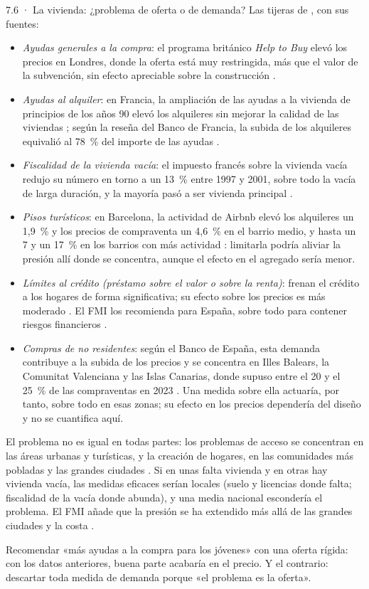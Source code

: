 \begin{complemento}{7.6 · La vivienda: ¿problema de oferta o de demanda? Las tijeras de }
, con sus fuentes:
\begin{itemize}
\item \emph{Ayudas generales a la compra}: el programa británico \emph{Help to Buy} elevó los precios en Londres, donde la oferta está muy restringida, más que el valor de la subvención, sin efecto apreciable sobre la construcción \parencite{Carozzi2024HelpToBuy}.
\item \emph{Ayudas al alquiler}: en Francia, la ampliación de las ayudas a la vivienda de principios de los años 90 elevó los alquileres sin mejorar la calidad de las viviendas \parencite{Fack2006Ayudas}; según la reseña del Banco de Francia, la subida de los alquileres equivalió al 78~\% del importe de las ayudas \parencite{BdF2023AyudasVivienda}.
\item \emph{Fiscalidad de la vivienda vacía}: el impuesto francés sobre la vivienda vacía redujo su número en torno a un 13~\% entre 1997 y 2001, sobre todo la vacía de larga duración, y la mayoría pasó a ser vivienda principal \parencite{Segu2020Vacantes}.
\item \emph{Pisos turísticos}: en Barcelona, la actividad de Airbnb elevó los alquileres un 1,9~\% y los precios de compraventa un 4,6~\% en el barrio medio, y hasta un 7 y un 17~\% en los barrios con más actividad \parencite{GarciaLopez2020Airbnb}: limitarla podría aliviar la presión allí donde se concentra, aunque el efecto en el agregado sería menor.
\item \emph{Límites al crédito (préstamo sobre el valor o sobre la renta)}: frenan el crédito a los hogares de forma significativa; su efecto sobre los precios es más moderado \parencite{Alam2019Macroprudencial}. El FMI los recomienda para España, sobre todo para contener riesgos financieros .
\item \emph{Compras de no residentes}: según el Banco de España, esta demanda contribuye a la subida de los precios y se concentra en Illes Balears, la Comunitat Valenciana y las Islas Canarias, donde supuso entre el 20 y el 25~\% de las compraventas en 2023 \parencite[pp.~246-247]{BdE2024Vivienda}. Una medida sobre ella actuaría, por tanto, sobre todo en esas zonas; su efecto en los precios dependería del diseño y no se cuantifica aquí.
\end{itemize}

 El problema no es igual en todas partes: los problemas de acceso se concentran en las áreas urbanas y turísticas, y la creación de hogares, en las comunidades más pobladas y las grandes ciudades \parencite[pp.~232 y 242-243]{BdE2024Vivienda}. Si en unas falta vivienda y en otras hay vivienda vacía, las medidas eficaces serían locales (suelo y licencias donde falta; fiscalidad de la vacía donde abunda), y una media nacional escondería el problema. El FMI añade que la presión se ha extendido más allá de las grandes ciudades y la costa .

 Recomendar «más ayudas a la compra para los jóvenes» con una oferta rígida: con los datos anteriores, buena parte acabaría en el precio. Y el contrario: descartar toda medida de demanda porque «el problema es la oferta».
\end{complemento}
